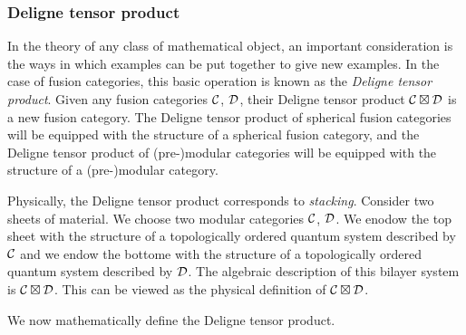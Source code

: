 
\subsubsection{Deligne tensor product}

In the theory of any class of mathematical object, an important consideration is the ways in which examples can be put together to give new examples. In the case of fusion categories, this basic operation is known as the {\em Deligne tensor product}. Given any fusion categories ${\mathcal C}$, ${\mathcal D}$, their Deligne tensor product ${\mathcal C}\boxtimes {\mathcal D}$ is a new fusion category. The Deligne tensor product of spherical fusion categories will be equipped with the structure of a spherical fusion category, and the Deligne tensor product of (pre-)modular categories will be equipped with the structure of a (pre-)modular category.

Physically, the Deligne tensor product corresponds to {\em stacking}. Consider two sheets of material. We choose two modular categories ${\mathcal C}$, ${\mathcal D}$. We enodow the top sheet with the structure of a topologically ordered quantum system described by ${\mathcal C}$ and we endow the bottome with the structure of a topologically ordered quantum system described by ${\mathcal D}$. The algebraic description of this bilayer system is ${\mathcal C}\boxtimes {\mathcal D}$. This can be viewed as the physical definition of ${\mathcal C}\boxtimes {\mathcal D}$.


We now mathematically define the Deligne tensor product.

